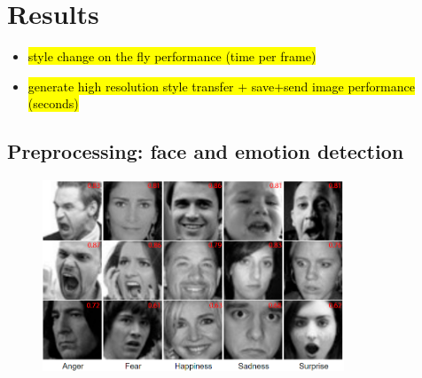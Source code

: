 

\section{Results}

\begin{itemize}
  \item \hl{style change on the fly performance (time per frame)}
  \item \hl{generate high resolution style transfer + save+send image performance (seconds)}
\end{itemize}

\subsection{Preprocessing: face and emotion detection}

\begin{figure}[ht]
    \centering
        \includegraphics[width = 9cm]{resources/emotion_faces_1.png}
         \label{fig:emotion_faces}
\end{figure}
  

